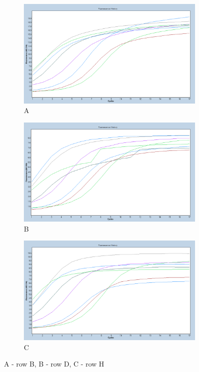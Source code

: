 \documentclass[parskip=full, numbers=noenddot]{scrreprt}
\begin{document}
\begin{figure}[htpb]
  \centering
  \begin{subfigure}[htpb]{0.3\textwidth}
    \includegraphics[scale=0.1]{qPCR_B}
    \caption{A}
    \label{fig:qpcr_a}
  \end{subfigure}
  \begin{subfigure}[htpb]{0.3\textwidth}
    \includegraphics[scale=0.1]{qPCR_D}
    \caption{B}
    \label{fig:qpcr_b}
  \end{subfigure}
  \begin{subfigure}[htpb]{0.3\textwidth}
    \includegraphics[scale=0.1]{qPCR_F}
    \caption{C}
    \label{fig:qpcr_c}
  \end{subfigure}
  \caption{A - row B, B - row D, C - row H}
  \label{fig:qpcr}
\end{figure}
\end{document}
